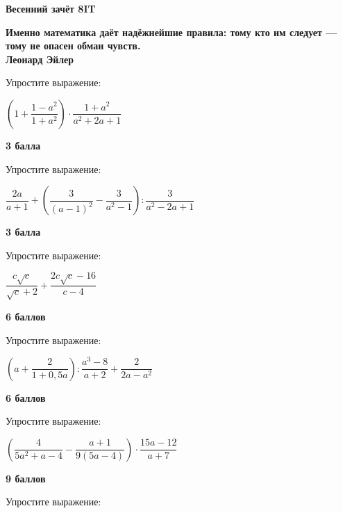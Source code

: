 \centerline{\bf \Huge Весенний зачёт 8IT}

\begin{flushright}
        \scriptsize{\textbf{Именно математика даёт надёжнейшие правила: тому кто им следует — тому не опасен обман чувств.\\
         Леонард Эйлер}}
        
\end{flushright}

 Упростите выражение:

$\left(1+\dfrac{1-a^2}{1+a^2}\right) \cdot \dfrac{1+a^2}{a^2+2 a+1}$

\begin{flushright} \textbf{3 балла}\\ 
\end{flushright}

 Упростите выражение:

$\dfrac{2 a}{a+1}+\left(\dfrac{3}{(a-1)^2}-\dfrac{3}{a^2-1}\right): \dfrac{3}{a^2-2 a+1}$

\begin{flushright} \textbf{3 балла}\\ 
\end{flushright}

 Упростите выражение:

$\dfrac{c \sqrt{c}}{\sqrt{c}+2}+\dfrac{2 c \sqrt{c}-16}{c-4}$

\begin{flushright} \textbf{6 баллов}\\ 
\end{flushright}

 Упростите выражение:

$\left(a+\dfrac{2}{1+0,5 a}\right): \dfrac{a^3-8}{a+2}+\dfrac{2}{2 a-a^2}$

\begin{flushright} \textbf{6 баллов}\\ 
\end{flushright}

 Упростите выражение:

$\left(\dfrac{4}{5 a^2+a-4}-\dfrac{a+1}{9(5 a-4)}\right) \cdot \dfrac{15 a-12}{a+7}$

\begin{flushright} \textbf{9 баллов}\\ 
\end{flushright}

 Упростите выражение:


